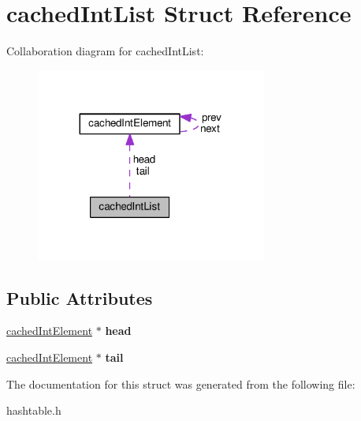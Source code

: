\hypertarget{structcachedIntList}{}\section{cached\+Int\+List Struct Reference}
\label{structcachedIntList}


Collaboration diagram for cached\+Int\+List\+:
\nopagebreak
\begin{figure}[H]
\begin{center}
\leavevmode
\includegraphics[width=215pt]{structcachedIntList__coll__graph}
\end{center}
\end{figure}
\subsection*{Public Attributes}
\begin{DoxyCompactItemize}
\item 
\hyperlink{structcachedIntElement}{cached\+Int\+Element} $\ast$ {\bfseries head}\hypertarget{structcachedIntList_ac4cce5e5d07c4b23683046e77a0fbe6a}{}\label{structcachedIntList_ac4cce5e5d07c4b23683046e77a0fbe6a}

\item 
\hyperlink{structcachedIntElement}{cached\+Int\+Element} $\ast$ {\bfseries tail}\hypertarget{structcachedIntList_adbe1df126c4425546e3a2b4366784c9d}{}\label{structcachedIntList_adbe1df126c4425546e3a2b4366784c9d}

\end{DoxyCompactItemize}


The documentation for this struct was generated from the following file\+:\begin{DoxyCompactItemize}
\item 
hashtable.\+h\end{DoxyCompactItemize}
